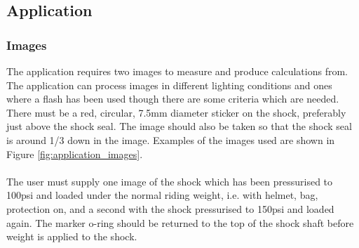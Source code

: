 \subsection{Application}
	\subsubsection{Images}
		The application requires two images to measure and produce calculations from. The application can process images in different lighting conditions and ones where a flash has been used though there are some criteria which are needed. There must be a red, circular, 7.5mm diameter sticker on the shock, preferably just above the shock seal. The image should also be taken so that the shock seal is around 1/3 down in the image. Examples of the images used are shown in Figure \ref{fig:application_images}.
		\\\\
		The user must supply one image of the shock which has been pressurised to 100psi and loaded under the normal riding weight, i.e. with helmet, bag, protection on, and a second with the shock pressurised to 150psi and loaded again. The marker o-ring should be returned to the top of the shock shaft before weight is applied to the shock.
